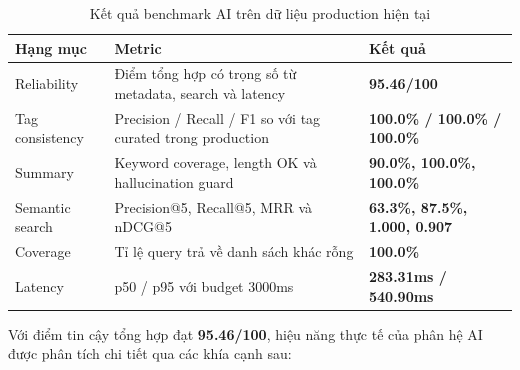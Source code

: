 \begin{table}[H]
\centering
\small
\renewcommand{\arraystretch}{1.3}
\begin{tabularx}{\textwidth}{|p{3.6cm}|X|p{3.2cm}|}
\hline
\textbf{Hạng mục} & \textbf{Metric} & \textbf{Kết quả} \\
\hline
Reliability & Điểm tổng hợp có trọng số từ metadata, search và latency & \textbf{95.46/100} \\
\hline
Tag consistency & Precision / Recall / F1 so với tag curated trong production & \textbf{100.0\% / 100.0\% / 100.0\%} \\
\hline
Summary & Keyword coverage, length OK và hallucination guard & \textbf{90.0\%, 100.0\%, 100.0\%} \\
\hline
Semantic search & Precision@5, Recall@5, MRR và nDCG@5 & \textbf{63.3\%, 87.5\%, 1.000, 0.907} \\
\hline
Coverage & Tỉ lệ query trả về danh sách khác rỗng & \textbf{100.0\%} \\
\hline
Latency & p50 / p95 với budget 3000ms & \textbf{283.31ms / 540.90ms} \\
\hline
\end{tabularx}
\caption{Kết quả benchmark AI trên dữ liệu production hiện tại}
\label{tab:ai_quality_benchmark_result}
\end{table}

Với điểm tin cậy tổng hợp đạt \textbf{95.46/100}, hiệu năng thực tế của phân hệ AI được phân tích chi tiết qua các khía cạnh sau:


